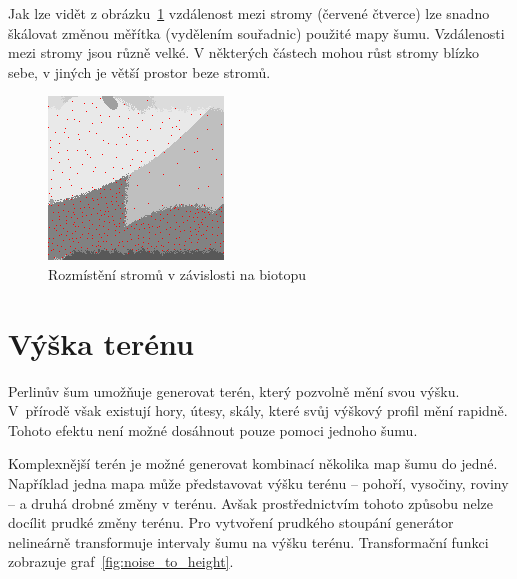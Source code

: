 \documentclass[thesis=M,czech]{FITthesis}[2019/12/23]
\begin{document}
Jak lze vidět z obrázku~\ref{fig:trees} vzdálenost mezi stromy (červené čtverce) lze snadno škálovat změnou měřítka (vydělením souřadnic) použité mapy šumu. Vzdálenosti mezi stromy jsou různě velké. V některých částech mohou růst stromy blízko sebe, v jiných je větší prostor beze stromů.

\begin{figure}\centering
	\includegraphics[width=\textwidth]{images/world_gen/trees}
	\caption[Rozmístění stromů v závislosti na biotopu]{Rozmístění stromů v závislosti na biotopu}\label{fig:trees}
\end{figure}

\section{Výška terénu}

Perlinův šum umožňuje generovat terén, který pozvolně mění svou výšku. V~přírodě však existují hory, útesy, skály, které svůj výškový profil mění rapidně. Tohoto efektu není možné dosáhnout pouze pomoci jednoho šumu.

Komplexnější terén je možné generovat kombinací několika map šumu do jedné. Například jedna mapa může představovat výšku terénu – pohoří, vysočiny, roviny – a druhá drobné změny v terénu. Avšak prostřednictvím tohoto způsobu nelze docílit prudké změny terénu. Pro vytvoření prudkého stoupání generátor nelineárně transformuje intervaly šumu na výšku terénu. Transformační funkci zobrazuje graf~\ref{fig:noise_to_height}.
\end{document}
